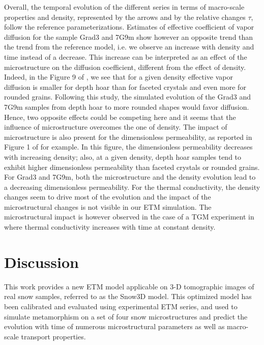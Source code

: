\documentclass[draft,ms]{agujournal2019}
\begin{document}
Overall, the temporal evolution of the different series in terms of macro-scale properties and density, represented by the arrows and by the relative changes $\tau$, follow the reference parameterizations.
%
Estimates of effective coefficient of vapor diffusion for the sample Grad3 and 7G9m show however an opposite trend than the trend from the reference model, i.e. we observe an increase with density and time instead of a decrease. This increase can be interpreted as an effect of the microstructure on the diffusion coefficient, different from the effect of density. Indeed, in the Figure 9 of , we see that for a given density effective vapor diffusion is smaller for depth hoar than for faceted crystals and even more for rounded grains. Following this study, the simulated evolution of the Grad3 and 7G9m samples from depth hoar to more rounded shapes would favor diffusion. Hence, two opposite effects could be competing here and it seems that the influence of microstructure overcomes the one of density.
The impact of microstructure is also present for the dimensionless permeability, as reported in Figure 1 of  for example. In this figure, the dimensionless permeability decreases with increasing density; also, at a given density, depth hoar samples tend to exhibit higher dimensionless permeability than faceted crystals or rounded grains. For Grad3 and 7G9m, both the microstructure and the density evolution lead to a decreasing dimensionless permeability.
For the thermal conductivity, the density changes seem to drive most of the evolution and the impact of the microstructural changes is not visible in our ETM simulation. The microstructural impact is however observed in the case of a TGM experiment in  where thermal conductivity increases with time at constant density.  


\section{Discussion}
\label{sec:disc}

This work provides a new ETM model applicable on 3-D tomographic images of real snow samples, referred to as the Snow3D model. This optimized model has been calibrated and evaluated using experimental ETM series, and used to simulate metamorphism on a set of four snow microstructures and predict the evolution with time of numerous microstructural parameters as well as macro-scale transport properties.
\end{document}
